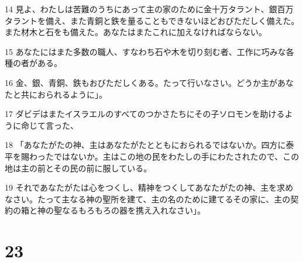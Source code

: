 \par 14 見よ、わたしは苦難のうちにあって主の家のために金十万タラント、銀百万タラントを備え、また青銅と鉄を量ることもできないほどおびただしく備えた。また材木と石をも備えた。あなたはまたこれに加えなければならない。
\par 15 あなたにはまた多数の職人、すなわち石や木を切り刻む者、工作に巧みな各種の者がある。
\par 16 金、銀、青銅、鉄もおびただしくある。たって行いなさい。どうか主があなたと共におられるように」。
\par 17 ダビデはまたイスラエルのすべてのつかさたちにその子ソロモンを助けるように命じて言った、
\par 18 「あなたがたの神、主はあなたがたとともにおられるではないか。四方に泰平を賜わったではないか。主はこの地の民をわたしの手にわたされたので、この地は主の前とその民の前に服している。
\par 19 それであなたがたは心をつくし、精神をつくしてあなたがたの神、主を求めなさい。たって主なる神の聖所を建て、主の名のために建てるその家に、主の契約の箱と神の聖なるもろもろの器を携え入れなさい」。

\chapter{23}

